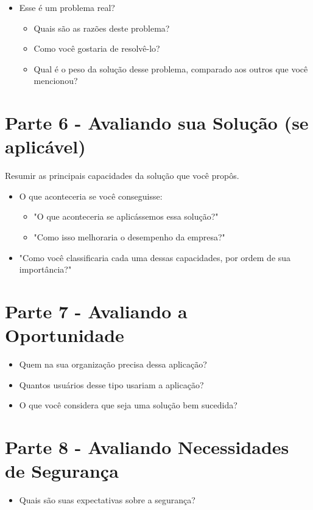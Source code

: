 \begin{anexosenv}
\begin{itemize}
  \item Esse é um problema real?
    \begin{itemize}
      \item Quais são as razões deste problema?
      \item Como você gostaria de resolvê-lo?
      \item Qual é o peso da solução desse problema, comparado aos outros que você mencionou?
    \end{itemize}
\end{itemize}

\section{Parte 6 - Avaliando sua Solução (se aplicável)}
Resumir as principais capacidades da solução que você propôs.

\begin{itemize}
  \item O que aconteceria se você conseguisse:
    \begin{itemize}
      \item "O que aconteceria se aplicássemos essa solução?"
      \item "Como isso melhoraria o desempenho da empresa?"
    \end{itemize}
  \item "Como você classificaria cada uma dessas capacidades, por ordem de sua importância?"
\end{itemize}


\section{Parte 7 - Avaliando a Oportunidade}
\begin{itemize}
  \item Quem na sua organização precisa dessa aplicação?
  \item Quantos usuários desse tipo usariam a aplicação?
  \item O que você considera que seja uma solução bem sucedida?
\end{itemize}

\section{Parte 8 - Avaliando Necessidades de Segurança}
\begin{itemize}
  \item Quais são suas expectativas sobre a segurança?
\end{itemize}


\end{anexosenv}
